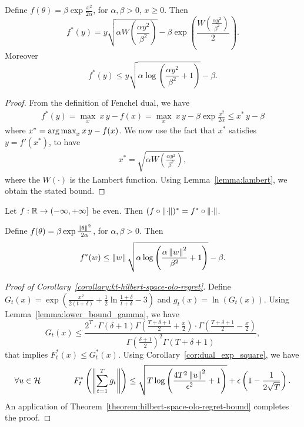 \begin{lemma}
Define $f(\theta)= \beta \exp\frac{x^2}{2 \alpha}$, for $\alpha,\beta>0$, $x\geq0$. Then
\[
f^*(y)=y \sqrt{\alpha W\left(\frac{\alpha y^2}{\beta^2}\right)} - \beta \exp\left(\frac{W\left(\frac{\alpha y^2}{\beta^2}\right)}{2}\right).
\]
Moreover
\[
f^*(y) \leq y \sqrt{\alpha \log \left(\frac{\alpha y^2}{\beta^2} +1 \right)} - \beta.
\]
\end{lemma}
\begin{proof}
From the definition of Fenchel dual, we have
\begin{align*}
f^*(y)= \max_{x} \  x\, y - f(x) = \max_{x} \  x\, y - \beta \exp\frac{x^2}{2 \alpha} \leq x^*\,y -\beta
\end{align*}
where $x^*= \operatorname*{arg\,max}_{x} x\, y - f(x)$. We now use the fact that $x^*$ satisfies $y = f'(x^*)$, to have
\begin{align*}
x^*=\sqrt{\alpha W\left(\frac{\alpha y^2}{\beta^2}\right)},
\end{align*}
where the $W(\cdot)$ is the Lambert function.
Using Lemma~\ref{lemma:lambert}, we obtain the stated bound.
\end{proof}

\begin{lemma}
Let $f:\mathbb{R} \rightarrow (-\infty, +\infty]$ be even. Then $(f \circ \left\|{\cdot}\right\|)^*=f^* \circ \left\|{\cdot}\right\|$.
\end{lemma}

\begin{corollary}
\label{cor:dual_exp_square}
Define $f(\theta)= \beta \exp\frac{\left\|{\theta}\right\|^2}{2 \alpha}$, for $\alpha,\beta>0$. Then
\[
f^*(w) \leq  \left\|{w}\right\| \sqrt{\alpha \log \left(\frac{\alpha \left\|{w}\right\|^2}{\beta^2} +1 \right)} - \beta.
\]
\end{corollary}


\begin{proof}[Proof of Corollary~\ref{corollary:kt-hilbert-space-olo-regret}]
Define $G_t(x)=\exp\left(\frac{x^2}{2(t+\delta)} +\frac{1}{2} \ln \frac{1+\delta}{t+\delta} -3\right)$ and $g_t(x)=\ln(G_t(x))$.
Using Lemma~\ref{lemma:lower_bound_gamma}, we have
\[
G_t(x) \leq \frac{2^T \cdot \Gamma(\delta+1) \Gamma \left(\frac{T+\delta+1}{2} + \frac{x}{2} \right) \cdot \Gamma \left(\frac{T+\delta+1}{2} - \frac{x}{2} \right)}{ \Gamma(\frac{\delta+1}{2})^2 \Gamma(T+\delta+1)},
\]
that implies $F^*_t(x) \leq G_t^*(x)$.
Using Corollary~\ref{cor:dual_exp_square}, we have
\[
\forall u \in \mathcal{H} \qquad \qquad 
F^*_t\left(\left\| \sum_{t=1}^T g_t \right\|\right) 
\leq \sqrt{T \log \left(\frac{4 T^2 \left\|{u}\right\|^2}{\epsilon^2} +1 \right)}+\epsilon\left(1-\frac{1}{2\sqrt{T}}\right).
\]
An application of Theorem~\ref{theorem:hilbert-space-olo-regret-bound} completes the proof.
\end{proof}

